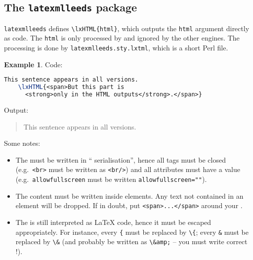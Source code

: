 \documentclass[a4paper]{article}
\theoremstyle{definition}
\newtheorem{exa}{Example}[subsection]
\begin{document}
\subsection{The \texttt{latexmlleeds} package}
\verb|latexmlleeds| defines \verb|\lxHTML{html}|, which outputs the \verb|html| argument directly as \HTML{} code. The \verb|html| is only processed by \LaTeXML{} and ignored by the other engines. The \LaTeXML{} processing is done by \verb|latexmlleeds.sty.lxtml|, which is a short Perl file.
\begin{exa}
  Code:
  \begin{lstlisting}[language=TeX]
    This sentence appears in all versions.
    \lxHTML{<span>But this part is
      <strong>only in the HTML outputs</strong>.</span>}
  \end{lstlisting}
  Output:
  \begin{quote}
    This sentence appears in all versions.
  \end{quote}
\end{exa}

Some notes:
\begin{itemize}
  \item The \HTML{} must be written in ``\XML{} serialisation'', hence all tags must be closed (e.g.\ \verb|<br>| must be written as \verb|<br/>|) and all attributes must have a value (e.g.\ \verb|allowfullscreen| must be written \verb|allowfullscreen=""|).
  \item The content must be written inside \HTML{} elements. Any text not contained in an element will be dropped. If in doubt, put \verb|<span>...</span>| around your \HTML{}.
  \item The \HTML{} is still interpreted as \LaTeX{} code, hence it must be escaped appropriately. For instance, every \verb|{| must be replaced by \verb|\{|; every \verb|&| must be replaced by \verb|\&| (and probably be written as \verb|\&amp;| -- you must write correct \HTML{}!).
\end{itemize}
\end{document}
